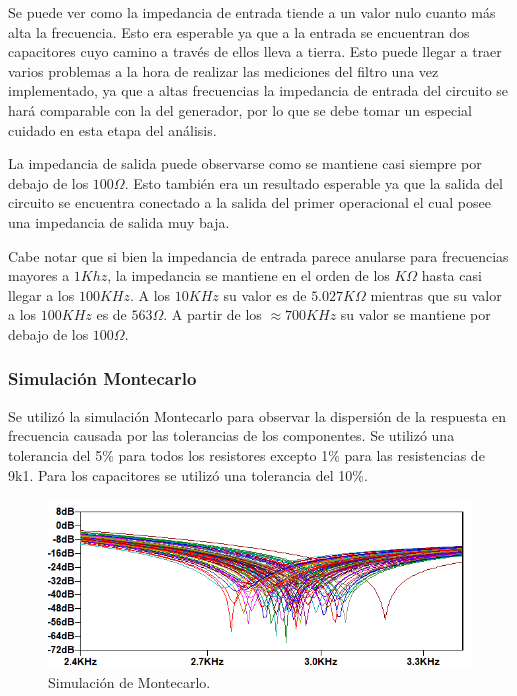 Se puede ver como la impedancia de entrada tiende a un valor nulo cuanto más alta la frecuencia. Esto era esperable ya que a la entrada se encuentran dos capacitores cuyo camino a través de ellos lleva a tierra. Esto puede llegar a traer varios problemas a la hora de realizar las mediciones del filtro una vez implementado, ya que a altas frecuencias la impedancia de entrada del circuito se hará comparable con la del generador, por lo que se debe tomar un especial cuidado en esta etapa del análisis.

La impedancia de salida puede observarse como se mantiene casi siempre por debajo de los $100\Omega$. Esto también era un resultado esperable ya que la salida del circuito se encuentra conectado a la salida del primer operacional el cual posee una impedancia de salida muy baja.

Cabe notar que si bien la impedancia de entrada parece anularse para frecuencias mayores a $1Khz$, la impedancia se mantiene en el orden de los $K\Omega$ hasta casi llegar a los $100KHz$. A los $10KHz$ su valor es de $5.027K\Omega$ mientras que su valor a los $100KHz$ es de $563\Omega$. A partir de los $\approx 700KHz$ su valor se mantiene por debajo de los $100\Omega$.

\subsubsection{Simulación Montecarlo}
\label{sec:mont}
Se utilizó la simulación Montecarlo para observar la dispersión de la respuesta en frecuencia causada por las tolerancias de los componentes. Se utilizó una tolerancia del 5\% para todos los resistores excepto 1\% para las resistencias de 9k1. Para los capacitores se utilizó una tolerancia del 10\%.

\begin{figure}[H]
	\centering
	\includegraphics[width=\textwidth]{Imagenes/Montecarlo1.PNG}
	\caption{Simulación de Montecarlo.}
	\label{fig:montecarlo}
\end{figure}

